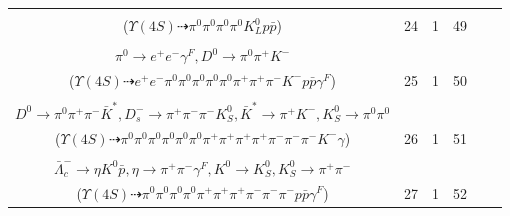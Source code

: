 \documentclass[landscape]{article}
\newcounter{rownumbers}
\newcommand\rn{\stepcounter{rownumbers}\arabic{rownumbers}}
\newcommand{\EOLP}{\\ \hline} %
\newcommand{\topoTags}[1]{#1} %
\begin{document}
\begin{longtable}{clcccc}
\rn & \makecell[l]{ $ 
\Upsilon(4S) \rightarrow B^{0} \bar{B}^{0} ,
B^{0} \rightarrow \pi^{0} \bar{D}^{0} ,
\bar{B}^{0} \rightarrow \bar{K}^{0} \bar{p} \Lambda_{c}^{+} ,
\bar{D}^{0} \rightarrow \pi^{0} \pi^{0} ,
\bar{K}^{0} \rightarrow K_{L}^{0} ,
\Lambda_{c}^{+} \rightarrow \pi^{0} p 
$ \\ ($
\Upsilon(4S) \dashrightarrow \pi^{0} \pi^{0} \pi^{0} \pi^{0} K_{L}^{0} p \bar{p} 
$) } & \topoTags{24 & }1 & 49 \EOLP

\rn & \makecell[l]{ $ 
\Upsilon(4S) \rightarrow B^{0} \bar{B}^{0} ,
B^{0} \rightarrow \pi^{0} \bar{D}^{0} ,
\bar{B}^{0} \rightarrow \pi^{+} \rho^{-} D^{*0} p \bar{p} ,
\bar{D}^{0} \rightarrow \pi^{0} \pi^{0} ,
\rho^{-} \rightarrow \pi^{0} \pi^{-} ,
D^{*0} \rightarrow \pi^{0} D^{0} ,
$ \\ $
\pi^{0} \rightarrow e^{+} e^{-} \gamma^{F} ,
D^{0} \rightarrow \pi^{0} \pi^{+} K^{-} 
$ \\ ($
\Upsilon(4S) \dashrightarrow e^{+} e^{-} \pi^{0} \pi^{0} \pi^{0} \pi^{0} \pi^{0} \pi^{+} \pi^{+} \pi^{-} K^{-} p \bar{p} \gamma^{F} 
$) } & \topoTags{25 & }1 & 50 \EOLP

\rn & \makecell[l]{ $ 
\Upsilon(4S) \rightarrow \bar{B}^{0} \bar{B}^{0} ,
\bar{B}^{0} \rightarrow \pi^{0} D^{0} ,
\bar{B}^{0} \rightarrow D^{*+} D_{s}^{*-} ,
D^{0} \rightarrow \pi^{0} \pi^{0} ,
D^{*+} \rightarrow \pi^{+} D^{0} ,
D_{s}^{*-} \rightarrow D_{s}^{-} \gamma ,
$ \\ $
D^{0} \rightarrow \pi^{0} \pi^{+} \pi^{-} \bar{K}^{*} ,
D_{s}^{-} \rightarrow \pi^{+} \pi^{-} \pi^{-} K_{S}^{0} ,
\bar{K}^{*} \rightarrow \pi^{+} K^{-} ,
K_{S}^{0} \rightarrow \pi^{0} \pi^{0} 
$ \\ ($
\Upsilon(4S) \dashrightarrow \pi^{0} \pi^{0} \pi^{0} \pi^{0} \pi^{0} \pi^{0} \pi^{+} \pi^{+} \pi^{+} \pi^{+} \pi^{-} \pi^{-} \pi^{-} K^{-} \gamma 
$) } & \topoTags{26 & }1 & 51 \EOLP

\rn & \makecell[l]{ $ 
\Upsilon(4S) \rightarrow B^{0} \bar{B}^{0} ,
B^{0} \rightarrow \pi^{+} \Delta^{0} \bar{\Sigma}_{c}^{-} ,
\bar{B}^{0} \rightarrow \pi^{0} D^{0} ,
\Delta^{0} \rightarrow \pi^{-} p ,
\bar{\Sigma}_{c}^{-} \rightarrow \pi^{0} \bar{\Lambda}_{c}^{-} ,
D^{0} \rightarrow \pi^{0} \pi^{0} ,
$ \\ $
\bar{\Lambda}_{c}^{-} \rightarrow \eta K^{0} \bar{p} ,
\eta \rightarrow \pi^{+} \pi^{-} \gamma^{F} ,
K^{0} \rightarrow K_{S}^{0} ,
K_{S}^{0} \rightarrow \pi^{+} \pi^{-} 
$ \\ ($
\Upsilon(4S) \dashrightarrow \pi^{0} \pi^{0} \pi^{0} \pi^{0} \pi^{+} \pi^{+} \pi^{+} \pi^{-} \pi^{-} \pi^{-} p \bar{p} \gamma^{F} 
$) } & \topoTags{27 & }1 & 52 \EOLP


\end{longtable}
\end{document}
